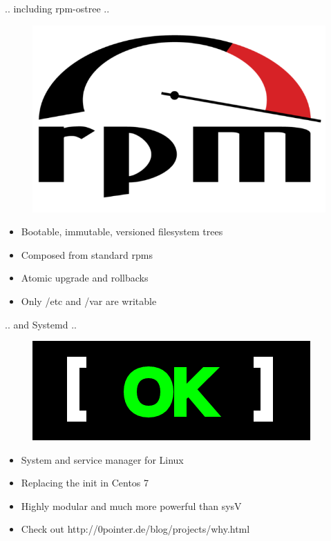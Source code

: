 \documentclass{beamer}
\begin{document}
\begin{frame}{.. including rpm-ostree ..}
\begin{figure}[htp]
\centering
\includegraphics[scale=0.70]{Rpm_logo.png}
\label{}
\end{figure}
\begin{itemize}
  \item Bootable, immutable, versioned filesystem trees
  \item Composed from standard rpms
  \item Atomic upgrade and rollbacks
  \item Only /etc and /var are writable
\end{itemize}
\end{frame}

\begin{frame}{.. and Systemd ..}
\begin{figure}[htp]
\centering
\includegraphics[scale=0.45]{systemd.png}
\label{}
\end{figure}
\begin{itemize}
  \item System and service manager for Linux 
  \item Replacing the init in Centos 7
  \item Highly modular and much more powerful than sysV
  \item Check out http://0pointer.de/blog/projects/why.html
\end{itemize}
\end{frame}
\end{document}
